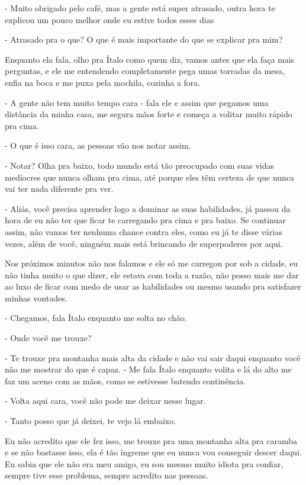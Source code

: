 - Muito obrigado pelo café, mas a gente está super atrasado, outra hora te explicou um pouco melhor onde eu estive todos esses dias

- Atrasado pra o que? O que é mais importante do que se explicar pra mim?

Enquanto ela fala, olho pra Ítalo como quem diz, vamos antes que ela faça mais perguntas, e ele me entendendo completamente pega umas torradas da mesa, enfia na boca e me puxa pela mochila, cozinha a fora.

- A gente não tem muito tempo cara - fala ele e assim que pegamos uma distância da minha casa, me segura mãos forte e começa a volitar muito rápido pra cima.

- O que é isso cara, as pessoas vão nos notar assim.

- Notar? Olha pra baixo, todo mundo está tão preocupado com suas vidas medíocres que nunca olham pra cima, até porque eles têm certeza de que nunca vai ter nada diferente pra ver.

- Aliás, você precisa aprender logo a dominar as suas habilidades, já passou da hora de eu não ter que ficar te carregando pra cima e pra baixo. Se continuar assim, não vamos ter nenhuma chance contra eles, como eu já te disse várias vezes, além de você, ninguém mais está brincando de superpoderes por aqui.

Nos próximos minutos não nos falamos e ele só me carregou por sob a cidade, eu não tinha muito o que dizer, ele estava com toda a razão, não posso mais me dar ao luxo de ficar com medo de usar as habilidades ou mesmo usando pra satisfazer minhas vontades.

- Chegamos, fala Ítalo enquanto me solta no chão.

- Onde você me trouxe?

- Te trouxe pra montanha mais alta da cidade e não vai sair daqui enquanto você não me mostrar do que é capaz. - Me fala Ítalo enquanto volita e lá do alto me faz um aceno com as mãos, como se estivesse batendo continência.

- Volta aqui cara, você não pode me deixar nesse lugar.

- Tanto posso que já deixei, te vejo lá embaixo.

Eu não acredito que ele fez isso, me trouxe pra uma montanha alta pra caramba e se não bastasse isso, ela é tão íngreme que eu nunca vou conseguir descer daqui. Eu sabia que ele não era meu amigo, eu sou mesmo muito idiota pra confiar, sempre tive esse problema, sempre acredito nas pessoas.

